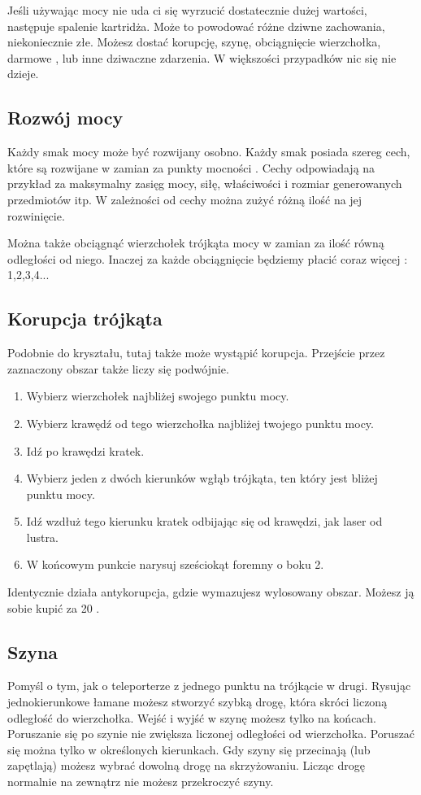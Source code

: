 Jeśli używając mocy nie uda ci się wyrzucić dostatecznie dużej wartości, następuje spalenie kartridża.
Może to powodować różne dziwne zachowania, niekoniecznie złe.
Możesz dostać korupcję, szynę, obciągnięcie wierzchołka, darmowe \xpmcn, lub inne dziwaczne zdarzenia. 
W większości przypadków nic się nie dzieje.

\subsection{Rozwój mocy}
Każdy smak mocy może być rozwijany osobno.
Każdy smak posiada szereg cech, które są rozwijane w zamian za punkty mocności \xpmcn.
Cechy odpowiadają na przykład za maksymalny zasięg mocy, siłę, właściwości i rozmiar generowanych przedmiotów itp.
W zależności od cechy można zużyć różną ilość \xpmcn na jej rozwinięcie.

Można także obciągnąć wierzchołek trójkąta mocy w zamian za ilość \xpmcn równą odległości od niego. 
Inaczej za każde obciągnięcie będziemy płacić coraz więcej \xpmcn: 1,2,3,4...

\subsection{Korupcja trójkąta}
Podobnie do kryształu, tutaj także może wystąpić korupcja.
Przejście przez zaznaczony obszar także liczy się podwójnie.
\begin{enumerate}
 \item Wybierz wierzchołek najbliżej swojego punktu mocy.
 \item Wybierz krawędź od tego wierzchołka najbliżej twojego punktu mocy.
 \item Idź po krawędzi \dxx kratek.
 \item Wybierz jeden z dwóch kierunków wgłąb trójkąta, ten który jest bliżej punktu mocy.
 \item Idź wzdłuż tego kierunku \dxx[5] kratek odbijając się od krawędzi, jak laser od lustra.
 \item W końcowym punkcie narysuj sześciokąt foremny o boku 2.
\end{enumerate}
Identycznie działa antykorupcja, gdzie wymazujesz wylosowany obszar. Możesz ją sobie kupić za 20 \xpmcn.

\subsection{Szyna}
Pomyśl o tym, jak o teleporterze z jednego punktu na trójkącie w drugi.
Rysując jednokierunkowe łamane możesz stworzyć szybką drogę, która skróci liczoną odległość do wierzchołka.
Wejść i wyjść w szynę możesz tylko na końcach.
Poruszanie się po szynie nie zwiększa liczonej odległości od wierzchołka.
Poruszać się można tylko w określonych kierunkach.
Gdy szyny się przecinają (lub zapętlają) możesz wybrać dowolną drogę na skrzyżowaniu.
Licząc drogę normalnie na zewnątrz nie możesz przekroczyć szyny.

